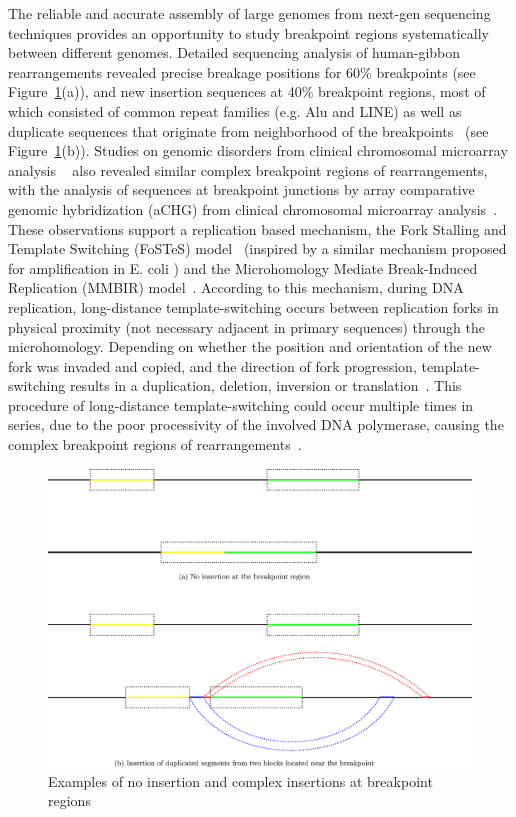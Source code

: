 \documentclass[12pt]{article}
\begin{document}
The reliable and accurate assembly of large genomes from next-gen sequencing techniques 
provides an opportunity to study breakpoint regions systematically between different genomes.
Detailed sequencing analysis of human-gibbon rearrangements revealed precise breakage positions for 60\% breakpoints (see Figure~\ref{breakpoint2}(a)), 
and new insertion sequences at 40\% breakpoint regions, most of which consisted of common repeat families (e.g. Alu and LINE) 
as well as duplicate sequences that originate from neighborhood of the breakpoints~\cite{girirajan2009} (see Figure~\ref{breakpoint2}(b)).
Studies on genomic disorders from clinical chromosomal microarray analysis ~\cite{lee2007dna,liu2011chromosome}
also revealed similar complex breakpoint regions of rearrangements, with the analysis of sequences at breakpoint junctions 
by array comparative genomic hybridization (aCHG) from clinical chromosomal microarray analysis~\cite{pinkel2005array}. 
These observations support a replication based mechanism, 
the Fork Stalling and Template Switching (FoSTeS) model~\cite{lee2007dna} (inspired by a similar mechanism proposed for amplification in E. coli \cite{slack2006mechanism}) 
and the Microhomology Mediate Break-Induced Replication (MMBIR) model~\cite{hastings2009microhomology}.
According to this mechanism, during DNA replication, 
long-distance template-switching occurs between replication forks in physical proximity (not necessary adjacent in primary sequences) through the microhomology.
Depending on whether the position and orientation of the new fork was invaded and copied, and the direction of fork progression, 
template-switching results in a duplication, deletion, inversion or translation~\cite{hastings2009microhomology}.
This procedure of long-distance template-switching could occur multiple times in series, 
due to the poor processivity of the involved DNA polymerase, causing the complex breakpoint regions of rearrangements~\cite{gu2008mechanisms}.

\begin{figure}[H]
\begin{center}
\includegraphics[width=1.0\textwidth]{breakpoint2.eps}
\caption{Examples of no insertion and complex insertions at breakpoint regions}
\label{breakpoint2}
\end{center}
\end{figure}
\end{document}
